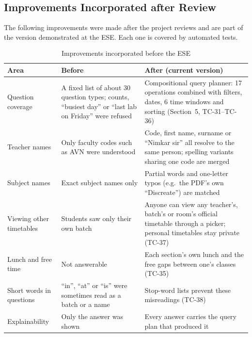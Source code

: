 \subsection{Improvements Incorporated after Review}
The following improvements were made after the project reviews and are part of the version
demonstrated at the ESE. Each one is covered by automated tests.
\begin{table}[H]
\centering
\caption{Improvements incorporated before the ESE}
\label{tab:improvements}
\small
\begin{tabularx}{\textwidth}{@{}p{3.6cm}XX@{}}
\toprule
\textbf{Area} & \textbf{Before} & \textbf{After (current version)}\\
\midrule
Question coverage & A fixed list of about 30 question types; counts, ``busiest day'' or ``last lab on Friday'' were refused & Compositional query planner: 17 operations combined with filters, dates, 6 time windows and sorting (Section~5, TC-31--TC-36)\\
Teacher names & Only faculty codes such as AVN were understood & Code, first name, surname or ``Nimkar sir'' all resolve to the same person; spelling variants sharing one code are merged\\
Subject names & Exact subject names only & Partial words and one-letter typos (e.g.\ the PDF's own ``Discreate'') are matched\\
Viewing other timetables & Students saw only their own batch & Anyone can view any teacher's, batch's or room's official timetable through a picker; personal timetables stay private (TC-37)\\
Lunch and free time & Not answerable & Each section's own lunch and the free gaps between one's classes (TC-35)\\
Short words in questions & ``in'', ``at'' or ``is'' were sometimes read as a batch or a name & Stop-word lists prevent these misreadings (TC-38)\\
Explainability & Only the answer was shown & Every answer carries the query plan that produced it\\
\bottomrule
\end{tabularx}
\end{table}

